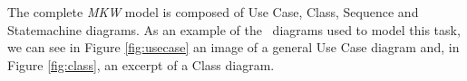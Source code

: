 The complete \emph{MKW} model is composed of Use Case, Class, Sequence and Statemachine diagrams.
As an example of the \uml\ diagrams used to model this task, we can see in Figure \ref{fig:usecase} an image of a general Use Case diagram and, in Figure \ref{fig:class}, an excerpt of a Class diagram.

